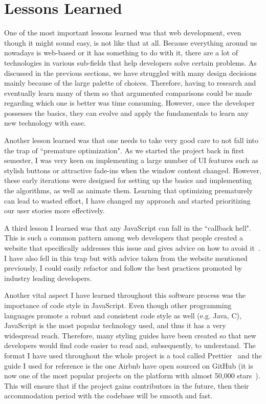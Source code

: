 \documentclass{l4proj}
\begin{document}
\section{Lessons Learned}

One of the most important lessons learned was that web development, even though it might sound easy, is not like that at all.
Because everything around us nowadays is web-based or it has something to do with it, there are a lot of technologies in
various sub-fields that help developers solve certain problems. As discussed in the previous sections, we have struggled
with many design decisions mainly because of the large palette of choices. Therefore, having to research and eventually
learn many of them so that argumented comparisons could be made regarding which one is better was time consuming.
However, once the developer possesses the basics, they can evolve and apply the fundamentals to learn any new
technology with ease.

Another lesson learned was that one needs to take very good care to not fall into the trap of ``premature optimization".
As we started the project back in first semester, I was very keen on implementing a large number of UI features such as
stylish buttons or attractive fade-ins when the window content changed. However, these early iterations were designed
for setting up the basics and implementing the algorithms, as well as animate them. Learning that optimizing prematurely
can lead to wasted effort, I have changed my approach and started prioritizing our user stories more effectively.

A third lesson I learned was that any JavaScript can fall in the ``callback hell". This is such a common pattern among
web developers that people created a website that specifically addresses this issue and gives advice on how to avoid
it~\cite{callback-hell}. I have also fell in this trap but with advice taken from the website mentioned previously, I
could easily refactor and follow the best practices promoted by industry leading developers.

Another vital aspect I have learned throughout this software process was the importance of code style in JavaScript. Even
though other programming languages promote a robust and consistent code style as well (e.g. Java, C), JavaScript is the
most popular technology used, and thus it has a very widespread reach. Therefore, many styling guides have been created so
that new developers would find code easier to read and, subsequently, to understand. The format I have used throughout
the whole project is a tool called Prettier~\cite{prettier} and the guide I used for reference is the one Airbnb have
open sourced on GitHub (it is now one of the most popular projects on the platform with almost 50,000
stars~\cite{airbnb-style-guide}). This will ensure that if the project gains contributors in the future, then their
accommodation period with the codebase will be smooth and fast.
\end{document}
